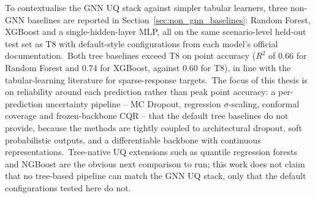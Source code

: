 To contextualise the GNN UQ stack against simpler tabular learners, three non-GNN baselines are reported in Section~\ref{sec:non_gnn_baselines}: Random Forest, XGBoost and a single-hidden-layer MLP, all on the same scenario-level held-out test set as T8 with default-style configurations from each model's official documentation.\ Both tree baselines exceed T8 on point accuracy ($R^2$ of $0.66$ for Random Forest and $0.74$ for XGBoost, against $0.60$ for T8), in line with the tabular-learning literature for sparse-response targets.\ The focus of this thesis is on reliability around each prediction rather than peak point accuracy: a per-prediction uncertainty pipeline -- MC Dropout, regression $\sigma$-scaling, conformal coverage and frozen-backbone CQR -- that the default tree baselines do not provide, because the methods are tightly coupled to architectural dropout, soft probabilistic outputs, and a differentiable backbone with continuous representations.\ Tree-native UQ extensions such as quantile regression forests and NGBoost are the obvious next comparison to run; this work does not claim that no tree-based pipeline can match the GNN UQ stack, only that the default configurations tested here do not.
